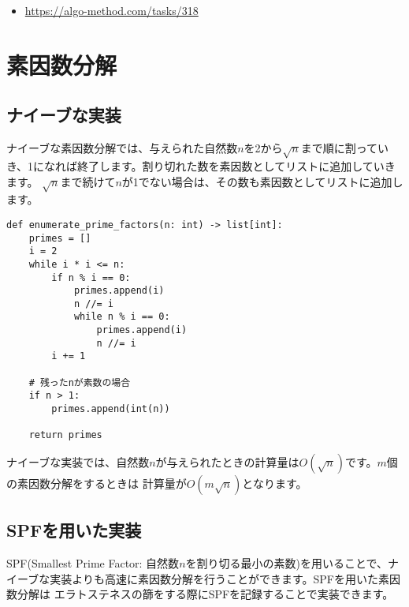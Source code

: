\documentclass{jlreq}
\begin{document}
\begin{itemize}
    \item \url{https://algo-method.com/tasks/318}
\end{itemize}

\section{素因数分解}
\subsection{ナイーブな実装}

ナイーブな素因数分解では、与えられた自然数$n$を2から$\sqrt{n}$まで順に割っていき、1になれば終了します。割り切れた数を素因数としてリストに追加していきます。
$\sqrt{n}$まで続けて$n$が1でない場合は、その数も素因数としてリストに追加します。

\begin{lstlisting}[caption=ナイーブな素因数分解の実装の実装, label=factor, frame=TRBL]
def enumerate_prime_factors(n: int) -> list[int]:
    primes = []
    i = 2
    while i * i <= n:
        if n % i == 0:
            primes.append(i)
            n //= i
            while n % i == 0:
                primes.append(i)
                n //= i
        i += 1

    # 残ったnが素数の場合
    if n > 1:
        primes.append(int(n))

    return primes
\end{lstlisting}

ナイーブな実装では、自然数$n$が与えられたときの計算量は$O(\sqrt{n})$です。$m$個の素因数分解をするときは
計算量が$O(m \sqrt{n})$となります。 

\subsection{SPFを用いた実装}

SPF(Smallest Prime Factor: 自然数$n$を割り切る最小の素数)を用いることで、ナイーブな実装よりも高速に素因数分解を行うことができます。SPFを用いた素因数分解は
エラトステネスの篩をする際にSPFを記録することで実装できます。
\end{document}
